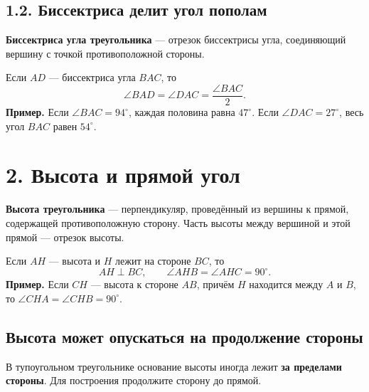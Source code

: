 \documentclass[a4paper,12pt]{article}
\newcommand{\sectionline}{\par\vspace{-3mm}{\color{accent}\hrule height .5pt}\vspace{4mm}}
\newcommand{\key}[1]{\textcolor{darkaccent}{\textbf{#1}}}
\begin{document}
\subsection*{1.2. Биссектриса делит угол пополам}
\key{Биссектриса угла треугольника} --- отрезок биссектрисы угла, соединяющий вершину с точкой противоположной стороны.

\begin{center}
\end{center}
Если $AD$ --- биссектриса угла $BAC$, то
\[
\angle BAD=\angle DAC=\frac{\angle BAC}{2}.
\]
\key{Пример.} Если $\angle BAC=94^\circ$, каждая половина равна $47^\circ$. Если $\angle DAC=27^\circ$, весь угол $BAC$ равен $54^\circ$.

\clearpage
\section*{2. Высота и прямой угол}
\sectionline
\key{Высота треугольника} --- перпендикуляр, проведённый из вершины к прямой, содержащей противоположную сторону. Часть высоты между вершиной и этой прямой --- отрезок высоты.

\begin{center}
\end{center}
Если $AH$ --- высота и $H$ лежит на стороне $BC$, то
\[
AH\perp BC,\qquad \angle AHB=\angle AHC=90^\circ.
\]
\key{Пример.} Если $CH$ --- высота к стороне $AB$, причём $H$ находится между $A$ и $B$, то $\angle CHA=\angle CHB=90^\circ$.

\subsection*{Высота может опускаться на продолжение стороны}
В тупоугольном треугольнике основание высоты иногда лежит \key{за пределами стороны}. Для построения продолжите сторону до прямой.
\end{document}
